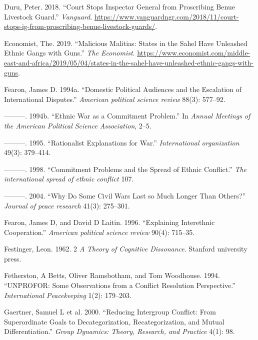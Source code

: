 \documentclass[11pt]{article}
\begin{document}
\hypertarget{ref-duru2018court}{}
Duru, Peter. 2018. ``Court Stops Inspector General from Proscribing
Benue Livestock Guard.'' \emph{Vanguard}.
\url{https://www.vanguardngr.com/2018/11/court-stops-ig-from-proscribing-benue-livestock-guards/}.

\hypertarget{ref-economist2019militias}{}
Economist, The. 2019. ``Malicious Malitias: States in the Sahel Have
Unleashed Ethnic Gangs with Guns.'' \emph{The Economist}.
\url{https://www.economist.com/middle-east-and-africa/2019/05/04/states-in-the-sahel-have-unleashed-ethnic-gangs-with-guns}.

\hypertarget{ref-fearon1994domestic}{}
Fearon, James D. 1994a. ``Domestic Political Audiences and the
Escalation of International Disputes.'' \emph{American political science
review} 88(3): 577--92.

\hypertarget{ref-fearon1994ethnic}{}
---------. 1994b. ``Ethnic War as a Commitment Problem.'' In
\emph{Annual Meetings of the American Political Science Association},
2--5.

\hypertarget{ref-fearon1995rationalist}{}
---------. 1995. ``Rationalist Explanations for War.''
\emph{International organization} 49(3): 379--414.

\hypertarget{ref-fearon1998commitment}{}
---------. 1998. ``Commitment Problems and the Spread of Ethnic
Conflict.'' \emph{The international spread of ethnic conflict} 107.

\hypertarget{ref-fearon2004civil}{}
---------. 2004. ``Why Do Some Civil Wars Last so Much Longer Than
Others?'' \emph{Journal of peace research} 41(3): 275--301.

\hypertarget{ref-fearon1996explaining}{}
Fearon, James D, and David D Laitin. 1996. ``Explaining Interethnic
Cooperation.'' \emph{American political science review} 90(4): 715--35.

\hypertarget{ref-festinger1962cognitiveDissonance}{}
Festinger, Leon. 1962. 2 \emph{A Theory of Cognitive Dissonance}.
Stanford university press.

\hypertarget{ref-fetherston1994unprofor}{}
Fetherston, A Betts, Oliver Ramsbotham, and Tom Woodhouse. 1994.
``UNPROFOR: Some Observations from a Conflict Resolution Perspective.''
\emph{International Peacekeeping} 1(2): 179--203.

\hypertarget{ref-gaertner2000reducing}{}
Gaertner, Samuel L et al. 2000. ``Reducing Intergroup Conflict: From
Superordinate Goals to Decategorization, Recategorization, and Mutual
Differentiation.'' \emph{Group Dynamics: Theory, Research, and Practice}
4(1): 98.
\end{document}
